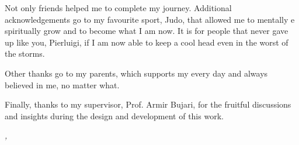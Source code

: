\vspace{0.3cm}

\noindent Not only friends helped me to complete my journey. Additional
acknowledgements go to my favourite sport, Judo, that allowed me to mentally e
spiritually grow and to become what I am now. It is for people that never gave
up like you, Pierluigi, if I am now able to keep a cool head even in the worst
of the storms.

\vspace{0.3cm}

\noindent Other thanks go to my parents, which supports my every day and always
believed in me, no matter what.

\vspace{0.3cm}

\noindent Finally, thanks to my supervisor, Prof. Armir Bujari, for the fruitful
discussions and insights during the design and development of this work.

\vspace{0.5cm}





\noindent\textit{\myLocation, \myTime}
\hfill \myName

\endgroup
